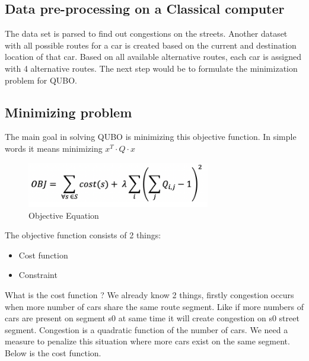 \documentclass[conference]{IEEEtran}
\begin{document}
\subsection{Data pre-processing on a Classical computer}
The data set is parsed to find out congestions on the streets. Another dataset with all possible routes for a car is created based on the current and destination location of that car. Based on all available alternative routes, each car is assigned with 4 alternative routes. The next step would be to formulate the minimization problem for QUBO.



\subsection{Minimizing problem}
The main goal in solving QUBO is minimizing this objective function. In simple words it means minimizing \( x^T \cdot Q \cdot x \)

\begin{figure}[ht]
\centerline{\includegraphics[width=8cm]{objective.png}}
\caption{Objective Equation}
\label{fig}
\end{figure}

The objective function consists of 2 things:\vspace{6pt}
\begin{itemize}
    \item Cost function
    \item Constraint
\end{itemize}
\vspace{6pt}
What is the cost function ?\vspace{6pt}
\newline
We already know 2 things, firstly congestion occurs when more number of cars share the same route segment. Like if more numbers of cars are present on segment s0 at same time it will create congestion on s0 street segment. Congestion is a quadratic function of the number of cars. We need a measure to penalize this situation where more cars exist on the same segment. Below is the cost function.\vspace{6pt}
\end{document}
